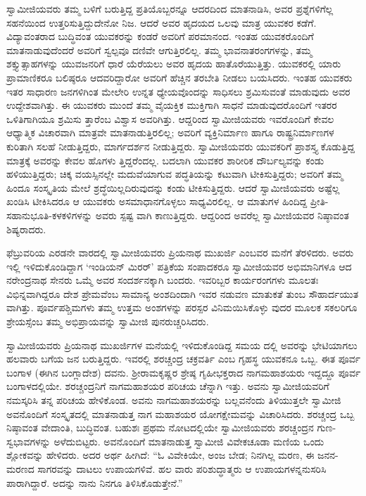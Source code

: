 ಸ್ವಾಮೀಜಿಯವರು ತಮ್ಮ ಬಳಿಗೆ ಬರುತ್ತಿದ್ದ ಪ್ರತಿಯೊಬ್ಬರನ್ನೂ ಆದರದಿಂದ ಮಾತನಾಡಿಸಿ, ಅವರ ಪ್ರಶ್ನೆಗಳಿಗೆಲ್ಲ ಸಹನೆಯಿಂದ ಉತ್ತರಿಸುತ್ತಿದ್ದುದೇನೋ ನಿಜ. ಆದರೆ ಅವರ ಹೃದಯದ ಒಲವು ಮಾತ್ರ ಯುವಕರ ಕಡೆಗೆ. ವಿದ್ಯಾವಂತರಾದ ಬುದ್ಧಿವಂತ ಯುವಕರನ್ನು ಕಂಡರೆ ಅವರಿಗೆ ಪರಮಾನಂದ. ಇಂತಹ ಯುವಕರೊಂದಿಗೆ ಮಾತನಾಡುವುದೆಂದರೆ ಅವರಿಗೆ ಸ್ವಲ್ಪವೂ ದಣಿವೇ ಆಗುತ್ತಿರಲಿಲ್ಲ. ತಮ್ಮ ಭಾವನಾತರಂಗಗಳನ್ನು, ತಮ್ಮ ಶಕ್ತ್ಯುತ್ಸಾಹಗಳನ್ನು ಯುವಜನರಿಗೆ ಧಾರೆ ಯೆರೆಯಲು ಅವರ ಹೃದಯ ಹಾತೊರೆಯುತ್ತಿತ್ತು. ಯುವಕರಲ್ಲಿ ಯಾರು ಪ್ರಾಮಾಣಿಕರೂ ಬಲಿಷ್ಠರೂ ಆದವರಿದ್ದಾರೋ ಅವರಿಗೆ ಹೆಚ್ಚಿನ ತರಬೇತಿ ನೀಡಲು ಬಯಸಿದರು. ಇಂತಹ ಯುವಕರು ಇತರ ಸಾಧಾರಣ ಜನಗಳಿಗಿಂತ ಮೇಲೇರಿ ಉನ್ನತ ಧ್ಯೇಯವೊಂದನ್ನು ಸಾಧಿಸಲು ಶ್ರಮಿಸುವಂತೆ ಮಾಡುವುದು ಅವರ ಉದ್ದೇಶವಾಗಿತ್ತು. ಈ ಯುವಕರು ಮುಂದೆ ತಮ್ಮ ವೈಯಕ್ತಿಕ ಮುಕ್ತಿಗಾಗಿ ಸಾಧನೆ ಮಾಡುವುದರೊಂದಿಗೆ ಇತರರ ಒಳಿತಿಗಾಗಿಯೂ ಶ್ರಮಿಸು ತ್ತಾರೆಂಬ ವಿಶ್ವಾಸ ಅವರಿಗಿತ್ತು. ಆದ್ದರಿಂದ ಸ್ವಾಮೀಜಿಯವರು ಇವರೊಂದಿಗೆ ಕೇವಲ ಆಧ್ಯಾತ್ಮಿಕ ವಿಚಾರವಾಗಿ ಮಾತ್ರವೇ ಮಾತನಾಡುತ್ತಿರಲಿಲ್ಲ; ಅವರಿಗೆ ವ್ಯಕ್ತಿನಿರ್ಮಾಣ ಹಾಗೂ ರಾಷ್ಟ್ರನಿರ್ಮಾಣಗಳ ಕುರಿತಾಗಿ ಸಲಹೆ ನೀಡುತ್ತಿದ್ದರು, ಮಾರ್ಗದರ್ಶನ ನೀಡುತ್ತಿದ್ದರು. ಸ್ವಾಮೀಜಿಯವರು ಯುವಕರಿಗೆ ಪ್ರಾಶಸ್ತ್ಯ ಕೊಡುತ್ತಿದ್ದ ಮಾತ್ರಕ್ಕೆ ಅವರನ್ನು ಕೇವಲ ಹೊಗಳು ತ್ತಿದ್ದರೆಂದಲ್ಲ. ಬದಲಾಗಿ ಯುವಕರ ಶಾರೀರಿಕ ದೌರ್ಬಲ್ಯವನ್ನು ಕಂಡು ಹಳಿಯುತ್ತಿದ್ದರು; ಚಿಕ್ಕ ವಯಸ್ಸಿನಲ್ಲೇ ಮದುವೆಯಾಗುವ ಪದ್ಧತಿಯನ್ನು ಕಟುವಾಗಿ ಟೀಕಿಸುತ್ತಿದ್ದರು; ಅವರಿಗೆ ತಮ್ಮ ಹಿಂದೂ ಸಂಸ್ಕೃತಿಯ ಮೇಲೆ ಶ್ರದ್ಧೆಯಿಲ್ಲದಿರುವುದನ್ನು ಕಂಡು ಟೀಕಿಸುತ್ತಿದ್ದರು. ಆದರೆ ಸ್ವಾಮೀಜಿಯವರು ಅಷ್ಟೆಲ್ಲ ಖಂಡಿಸಿ ಟೀಕಿಸಿದರೂ ಆ ಯುವಕರು ಅಸಮಾಧಾನಗೊಳ್ಳಲು ಸಾಧ್ಯವಿರಲಿಲ್ಲ. ಆ ಮಾತುಗಳ ಹಿಂದಿದ್ದ ಪ್ರೀತಿ-ಸಹಾನುಭೂತಿ-ಕಳಕಳಿಗಳನ್ನು ಅವರು ಸ್ಪಷ್ಟ ವಾಗಿ ಕಾಣುತ್ತಿದ್ದರು. ಆದ್ದರಿಂದ ಅವರೆಲ್ಲ ಸ್ವಾಮೀಜಿಯವರ ನಿಷ್ಠಾವಂತ ಶಿಷ್ಯರಾದರು.

ಫೆಬ್ರುವರಿಯ ಎರಡನೇ ವಾರದಲ್ಲಿ ಸ್ವಾಮೀಜಿಯವರು ಪ್ರಿಯನಾಥ ಮುಖರ್ಜಿ ಎಂಬವರ ಮನೆಗೆ ತೆರಳಿದರು. ಅವರು ಇಲ್ಲಿ ಇಳಿದುಕೊಂಡಿದ್ದಾಗ ‘ಇಂಡಿಯನ್ ಮಿರರ್​’ ಪತ್ರಿಕೆಯ ಸಂಪಾದಕರೂ ಸ್ವಾಮೀಜಿಯವರ ಅಭಿಮಾನಿಗಳೂ ಆದ ನರೇಂದ್ರನಾಥ ಸೇನರು ಒಮ್ಮೆ ಅವರ ಸಂದರ್ಶನಕ್ಕಾಗಿ ಬಂದರು. ಇವರಿಬ್ಬರ ಕಾರ್ಯರಂಗಗಳು ಮೂಲತಃ ವಿಭಿನ್ನವಾಗಿದ್ದರೂ ದೇಶ ಪ್ರೇಮವೆಂಬ ಸಾಮಾನ್ಯ ಅಂಶದಿಂದಾಗಿ ಇವರ ನಡುವಣ ಮಾತುಕತೆ ತುಂಬ ಸೌಹಾರ್ದಯುತ ವಾಗಿತ್ತು. ಪೂರ್ವಪಶ್ಚಿಮಗಳು ತಮ್ಮ ಉತ್ತಮ ಅಂಶಗಳನ್ನು ಪರಸ್ಪರ ವಿನಿಮಯಿಸಿಕೊಳ್ಳು ವುದರ ಮೂಲಕ ಸಕಲರಿಗೂ ಶ್ರೇಯಸ್ಸೆಂಬ ತಮ್ಮ ಅಭಿಪ್ರಾಯವನ್ನು ಸ್ವಾಮೀಜಿ ಪುನರುಚ್ಚರಿಸಿದರು.

ಸ್ವಾಮೀಜಿಯವರು ಪ್ರಿಯನಾಥ ಮುಖರ್ಜಿಗಳ ಮನೆಯಲ್ಲಿ ಇಳಿದುಕೊಂಡಿದ್ದ ಸಮಯ ದಲ್ಲಿ ಅವರನ್ನು ಭೇಟಿಯಾಗಲು ಹಲವಾರು ಬಗೆಯ ಜನ ಬರುತ್ತಿದ್ದರು. ಇವರಲ್ಲಿ ಶರಚ್ಚಂದ್ರ ಚಕ್ರವರ್ತಿ ಎಂಬ ಗೃಹಸ್ಥ ಯುವಕನೂ ಒಬ್ಬ. ಈತ ಪೂರ್ವ ಬಂಗಾಳ (ಈಗಿನ ಬಂಗ್ಲಾದೇಶ) ದವನು. ಶ್ರೀರಾಮಕೃಷ್ಣರ ಶ್ರೇಷ್ಠ ಗೃಹೀಭಕ್ತರಾದ ನಾಗಮಹಾಶಯರು ಇದ್ದದ್ದೂ ಪೂರ್ವ ಬಂಗಾಳದಲ್ಲಿಯೇ. ಶರಚ್ಚಂದ್ರನಿಗೆ ನಾಗಮಹಾಶಯರ ಪರಿಚಯ ಚೆನ್ನಾಗಿ ಇತ್ತು. ಅವನು ಸ್ವಾಮೀಜಿಯವರಿಗೆ ನಮಸ್ಕರಿಸಿ ತನ್ನ ಪರಿಚಯ ಹೇಳಿಕೊಂಡ. ಅವನು ನಾಗಮಹಾಶಯರನ್ನು ಬಲ್ಲವನೆಂದು ತಿಳಿಯುತ್ತಲೇ ಸ್ವಾಮೀಜಿ ಅವನೊಂದಿಗೆ ಸಂಸ್ಕೃತದಲ್ಲಿ ಮಾತನಾಡುತ್ತ ನಾಗ ಮಹಾಶಯರ ಯೋಗಕ್ಷೇಮವನ್ನು ವಿಚಾರಿಸಿದರು. ಶರಚ್ಚಂದ್ರ ಒಬ್ಬ ನಿಷ್ಠಾವಂತ ವೇದಾಂತಿ, ಬುದ್ಧಿವಂತ. ಬಹುಶಃ ಪ್ರಥಮ ನೋಟದಲ್ಲಿಯೇ ಸ್ವಾಮೀಜಿಯವರು ಶರಚ್ಚಂದ್ರನ ಗುಣ- ಸ್ವಭಾವಗಳನ್ನು ಅಳೆದುಬಿಟ್ಟರು. ಅವನೊಂದಿಗೆ ಮಾತನಾಡುತ್ತ ಸ್ವಾಮೀಜಿ ವಿವೇಕಚೂಡಾ ಮಣಿಯ ಒಂದು ಶ್ಲೋಕವನ್ನು ಹೇಳಿದರು. ಅದರ ಅರ್ಥ ಹೀಗಿದೆ: “ಓ ವಿವೇಕಿಯೇ, ಅಂಜ ಬೇಡ; ನಿನಗಿಲ್ಲ ಮರಣ, ಈ ಜನನ-ಮರಣದ ಸಾಗರವನ್ನು ದಾಟಲು ಉಪಾಯಗಳಿವೆ. ಹಲ ವಾರು ಪರಿಶುದ್ಧಾತ್ಮರು ಆ ಉಪಾಯಗಳನ್ನನುಸರಿಸಿ ಪಾರಾಗಿದ್ದಾರೆ. ಅದನ್ನು ನಾನು ನಿನಗೂ ತಿಳಿಸಿಕೊಡುತ್ತೇನೆ.”

